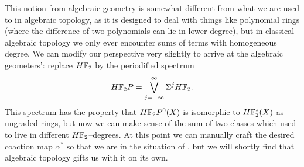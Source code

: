 This notion from algebraic geometry is somewhat different from what we are used to in algebraic topology, as it is designed to deal with things like polynomial rings (where the difference of two polynomials can lie in lower degree), but in classical algebraic topology we only ever encounter sums of terms with homogeneous degree.  We can modify our perspective very slightly to arrive at the algebraic geometers': replace $H\mathbb F_2$ by the periodified spectrum \[H\mathbb F_2P = \bigvee_{j=-\infty}^\infty \Sigma^j H\mathbb F_2.\]  This spectrum has the property that $H\mathbb F_2P^0(X)$ is isomorphic to $H\mathbb F_2^*(X)$ as ungraded rings, but now we can make sense of the sum of two classes which used to live in different $H\mathbb F_2$--degrees.  At this point we can manually craft the desired coaction map $\alpha^*$ so that we are in the situation of , but we will shortly find that algebraic topology gifts us with it on its own.

